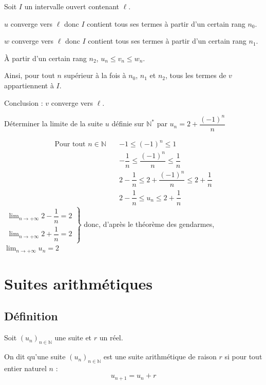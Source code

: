 \documentclass[french]{book}
\newcommand{\N}{\mathbb {N}}
\newcommand{\ie}{\leq}
\newcommand{\limn}{\lim_{n\rightarrow +\infty}}
\newcommand{\suite}[1][u]{\left( #1_{n} \right)_{n\in\N}}
\begin{document}
\begin{demo}
Soit $I$ un intervalle ouvert contenant $\ell$.
\par $u$ converge vers $\ell$ donc $I$ contient tous ses termes à partir d'un certain rang $n_{0}$.
\par $w$ converge vers $\ell$ donc $I$ contient tous ses termes à partir d'un certain rang $n_{1}$.
\par À partir d'un certain rang $n_{2}$, $u_{n} \ie v_{n} \ie w_{n}$.
\par Ainsi, pour tout $n$ supérieur à la fois à $n_{0}$, $n_{1}$ et $n_{2}$, tous les termes de $v$ appartiennent à $I$.
\par Conclusion : $v$ converge vers $\ell$.
\end{demo}

\newpage
\begin{exemple}
Déterminer la limite de la suite $u$ définie sur $\N^{*}$ par $u_{n}=2+\dfrac{(-1)^{n}}{n}$
\end{exemple}

\begin{align*}
\text{Pour tout } n \in \N \quad
&-1 \ie (-1)^n \ie 1 \\
&-\dfrac{1}{n} \ie \dfrac{(-1)^{n}}{n} \ie \dfrac{1}{n}\\
&2-\dfrac{1}{n} \ie 2+\dfrac{(-1)^{n}}{n} \ie 2+\dfrac{1}{n}\\
&2-\dfrac{1}{n} \ie u_n \ie 2+\dfrac{1}{n}
\end{align*}
$\left.\begin{array}{l}
\limn 2-\dfrac{1}{n}=2\\
\limn 2+\dfrac{1}{n}=2
\end{array}\right\}$
donc, d'après le théorème des gendarmes, $\limn u_n=2$


\section{Suites arithmétiques}
\subsection{Définition}
\begin{defn}
Soit $\suite[u]$ une suite et $r$ un réel.
 
On dit qu'une suite $\suite[u]$ est une suite arithmétique de raison $r$ si pour tout entier naturel $n$ : \[u_{n+1}=u_n+r\]
\end{defn}
\end{document}
